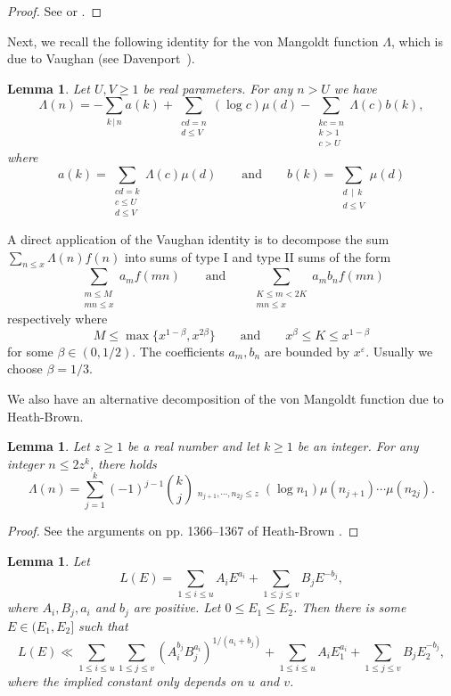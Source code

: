 \documentclass[12pt, reqno, twoside, letterpaper]{amsart}
\numberwithin{equation}{section}
\def\eps{\varepsilon}
\def\mand{\qquad\mbox{and}\qquad}
\theoremstyle{customthm}
\newtheorem{lemma}[X]{Lemma}
\theoremstyle{customrem}
\renewcommand{\le}{\ensuremath{\leqslant}}
\renewcommand{\ge}{\ensuremath{\geqslant}}
\begin{document}
\begin{proof}
See \cite[Chapter 3]{GrahamK1991} or \cite[Lemma 1]{CaoZ1998}.
\end{proof}

Next, we recall the following identity for the von Mangoldt function $\Lambda$, which is due to Vaughan (see Davenport~\cite[p.~139]{Daven}).

\begin{lemma}
	\label{lem:vaughan}
	Let $U,V\ge 1$ be real parameters.  For any $n>U$ we have
	$$
	\Lambda(n)=
	-\sum_{k\,|\,n}a(k)
	+\sum_{\substack{cd=n\\d\le V}}(\log c)\mu(d)
	-\sum_{\substack{kc=n\\k>1\\c>U}}\Lambda(c)b(k),
	$$
	where
	$$
	a(k)=\sum_{\substack{cd=k\\c\le U\\d\le V}}\Lambda(c)\mu(d)
	\mand b(k)=\sum_{\substack{d\,\mid\,k\\d\le V}}\mu(d)
	$$
\end{lemma}

A direct application of the Vaughan identity is to decompose the sum $\sum_{n \le x} \Lambda(n) f(n)$ into sums of type I and type II sums of the form
$$
\sum_{\substack{m \le M \\ mn \le x}} a_m f(mn) \qquad \text{and} \qquad \sum_{\substack{K \le m < 2K \\ mn \le x}} a_m b_n f(mn)
$$
respectively where
$$
M \le \max\{x^{1-\beta}, x^{2\beta}\} \qquad \text{and} \qquad x^\beta \le K \le x^{1-\beta}
$$
for some $\beta \in (0,1/2)$. The coefficients $a_m, b_n$ are bounded by $x^\eps$. Usually we choose $\beta = 1/3$.

We also have an alternative decomposition of the von Mangoldt function due to Heath-Brown.

\begin{lemma}\label{lem: Heath-Brown inentity}
Let $z\geqslant1$ be a real number and let $k\geqslant1$ be an integer.
For any integer $n\leqslant2z^k$, there holds
$$
\Lambda(n)=\sum_{j=1}^{k}(-1)^{j-1}\binom{k}{j}
\mathop{\sum_{n_1\cdots n_{2j}=n}}_{n_{j+1},\cdots,n_{2j}\leqslant z}
(\log n_1)\mu(n_{j+1})\cdots\mu(n_{2j}).
$$
\end{lemma}
\begin{proof}
See the arguments on pp. 1366--1367 of Heath-Brown \cite{Heath-Brown}.
\end{proof}




\begin{lemma} \label{lemmea: balance} Let
$$
L(E)=\sum_{1\leqslant i\leqslant u}A_iE^{a_i}+\sum_{1\leqslant j\leqslant v}B_jE^{-b_j},
$$
where $A_i,B_j,a_i$ and $b_j$ are positive. Let $0\leqslant E_1\leqslant E_2$. Then there is
some $E\in(E_1,E_2]$ such that
$$
L(E)\ll \sum_{1\leqslant i\leqslant u}\sum_{1\leqslant j\leqslant v}\left(A_i^{b_j}B_j^{a_i}\right)^{1/(a_i+b_j)}
+\sum_{1\leqslant i\leqslant u}A_iE_1^{a_i}+\sum_{1\leqslant j\leqslant v}B_jE_2^{-b_j},
$$
where the implied constant only depends on $u$ and $v$.
\end{lemma}
\end{document}
